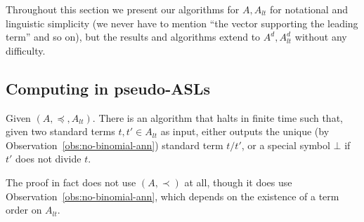 \documentclass[11pt,reqno]{amsart}
\theoremstyle{definition}
\numberwithin{equation}{section}
\begin{document}
Throughout this section we present our algorithms for $A, A_{lt}$ for notational and linguistic simplicity (we never have to mention ``the vector supporting the leading term'' and so on), but the results and algorithms extend to $A^d, A_{lt}^d$ without any difficulty.

\subsection{Computing in pseudo-ASLs}
\begin{proposition} \label{prop:div-alg}
Given $(A, \preceq, A_{lt})$. There is an algorithm that halts in finite time such that, given two standard terms $t,t' \in A_{lt}$ as input, either outputs the unique (by Observation~\ref{obs:no-binomial-ann}) standard term $t/t'$, or a special symbol $\bot$ if $t'$ does not divide $t$.
\end{proposition}

The proof in fact does not use $(A,\prec)$ at all, though it does use Observation~\ref{obs:no-binomial-ann}, which depends on the existence of a term order on $A_{lt}$.
\end{document}
